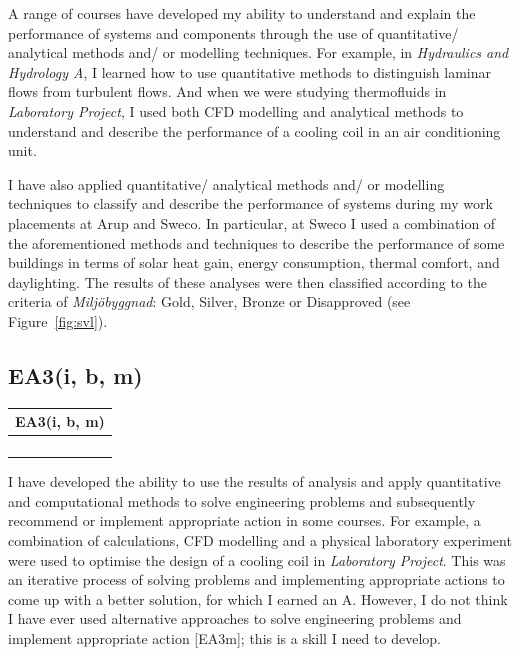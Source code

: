 A range of courses have developed my ability to understand and explain the performance of systems and components through the use of quantitative/ analytical methods and/ or modelling techniques.
For example, in \textit{Hydraulics and Hydrology A}, I learned how to use quantitative methods to distinguish laminar flows from turbulent flows.
And when we were studying thermofluids in \textit{Laboratory Project}, I used both CFD modelling and analytical methods to understand and describe the performance of a cooling coil in an air conditioning unit.

I have also applied quantitative/ analytical methods and/ or modelling techniques to classify and describe the performance of systems during my work placements at Arup and Sweco.
In particular, at Sweco I used a combination of the aforementioned methods and techniques to describe the performance of some buildings in terms of solar heat gain, energy consumption, thermal comfort, and daylighting.
The results of these analyses were then classified according to the criteria of \textit{Miljöbyggnad}: Gold, Silver, Bronze or Disapproved (see Figure~\ref{fig:svl}).








\subsection*{EA3(i, b, m)} \label{EA3}

\begin{table}
	\begin{tabular}{|ll|}
		\hline
		\multicolumn{2}{|c|}{\cellcolor[HTML]{F8A102}\textbf{EA3(i, b, m) \nomaster}} \\ \hline
		\MechB & \HYD \\
		\DPB & \DSA \\
		\EnBldgs & \TPS \\
		\PRJ & \LAB \\ \hline
	\end{tabular}
\end{table}

I have developed the ability to use the results of analysis and apply quantitative and computational methods to solve engineering problems and subsequently recommend or implement appropriate action in some courses.
For example, a combination of calculations, CFD modelling and a physical laboratory experiment were used to optimise the design of a cooling coil in \textit{Laboratory Project}.
This was an iterative process of solving problems and implementing appropriate actions to come up with a better solution, for which I earned an A.
However, I do not think I have ever used alternative approaches to solve engineering problems and implement appropriate action [EA3m]; this is a skill I need to develop.







